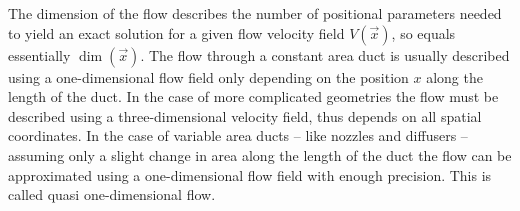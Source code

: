 	The dimension of the flow describes the number of positional parameters needed to yield an exact solution for a given flow velocity field $V(\vec{x})$, so equals essentially $\dim(\vec{x})$. 
	The flow through a constant area duct is usually described using a one-dimensional flow field only depending on the position $x$ along the length of the duct.
	In the case of more complicated geometries the flow must be described using a three-dimensional velocity field, thus depends on all spatial coordinates.
	In the case of variable area ducts -- like nozzles and diffusers -- assuming only a slight change in area along the length of the duct the flow can be approximated using a one-dimensional flow field with enough precision.
	This is called quasi one-dimensional flow. \cite{anderson2021modern}
